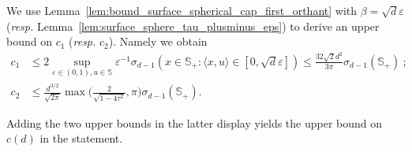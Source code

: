 \documentclass{article}
\numberwithin{equation}{section}
\newcommand{\sphere}{\mathbb{S}}
\begin{document}
  We use Lemma~\ref{lem:bound_surface_spherical_cap_first_orthant} with $\beta = \sqrt{d}\varepsilon$(\emph{resp.} Lemma~\ref{lem:surface_sphere_tau_plusminus_eps}) to derive an upper bound on $c_1$ (\emph{resp.} $c_ 2$). Namely we obtain 
  \begin{equation}
      \label{eq:bound_C1}
      \begin{aligned}
          c_1& \le 2 \sup_{\varepsilon\in(0,1), u \in \sphere}
\varepsilon^{-1}\sigma_{d-1}(x\in\sphere_+: 
 \langle x, u \rangle \in [0,\sqrt d \varepsilon] ) 
 \le 
 \frac{32\sqrt{2} d^{2}}{3\pi}\sigma_{d-1}(\sphere_+)~; \\
 c_2 & \le 
 \frac{d^{3/2}}{\sqrt{2\pi}}
      \max\Big(\frac{2 }{\sqrt{1 - 4\tau^2}}, 
       \pi %
       \Big)
      \sigma_{d-1}(\sphere_+).
      \end{aligned}
  \end{equation}

Adding the two upper bounds in the latter display yields the upper bound on $c(d)$ in the statement. 
\end{document}
